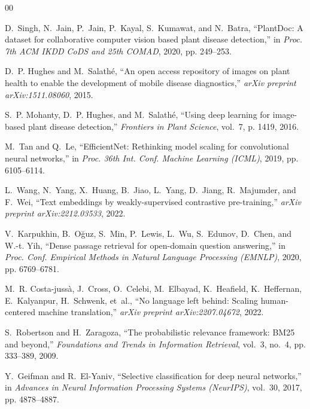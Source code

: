 \documentclass[conference]{IEEEtran}
\begin{document}
\begin{thebibliography}{00}

D.~Singh, N.~Jain, P.~Jain, P.~Kayal, S.~Kumawat, and N.~Batra, ``PlantDoc: A dataset for collaborative computer vision based plant disease detection,'' in \emph{Proc. 7th ACM IKDD CoDS and 25th COMAD}, 2020, pp. 249--253.

D.~P. Hughes and M.~Salath{\'e}, ``An open access repository of images on plant health to enable the development of mobile disease diagnostics,'' \emph{arXiv preprint arXiv:1511.08060}, 2015.

S.~P. Mohanty, D.~P. Hughes, and M.~Salath{\'e}, ``Using deep learning for image-based plant disease detection,'' \emph{Frontiers in Plant Science}, vol.~7, p. 1419, 2016.

M.~Tan and Q.~Le, ``EfficientNet: Rethinking model scaling for convolutional neural networks,'' in \emph{Proc. 36th Int. Conf. Machine Learning (ICML)}, 2019, pp. 6105--6114.

L.~Wang, N.~Yang, X.~Huang, B.~Jiao, L.~Yang, D.~Jiang, R.~Majumder, and F.~Wei, ``Text embeddings by weakly-supervised contrastive pre-training,'' \emph{arXiv preprint arXiv:2212.03533}, 2022.

V.~Karpukhin, B.~O{\u{g}}uz, S.~Min, P.~Lewis, L.~Wu, S.~Edunov, D.~Chen, and W.-t. Yih, ``Dense passage retrieval for open-domain question answering,'' in \emph{Proc. Conf. Empirical Methods in Natural Language Processing (EMNLP)}, 2020, pp. 6769--6781.

M.~R. Costa-juss{\`a}, J.~Cross, O.~Celebi, M.~Elbayad, K.~Heafield, K.~Heffernan, E.~Kalyanpur, H.~Schwenk, et~al., ``No language left behind: Scaling human-centered machine translation,'' \emph{arXiv preprint arXiv:2207.04672}, 2022.

S.~Robertson and H.~Zaragoza, ``The probabilistic relevance framework: BM25 and beyond,'' \emph{Foundations and Trends in Information Retrieval}, vol.~3, no.~4, pp. 333--389, 2009.

Y.~Geifman and R.~El-Yaniv, ``Selective classification for deep neural networks,'' in \emph{Advances in Neural Information Processing Systems (NeurIPS)}, vol.~30, 2017, pp. 4878--4887.


\end{thebibliography}
\end{document}

